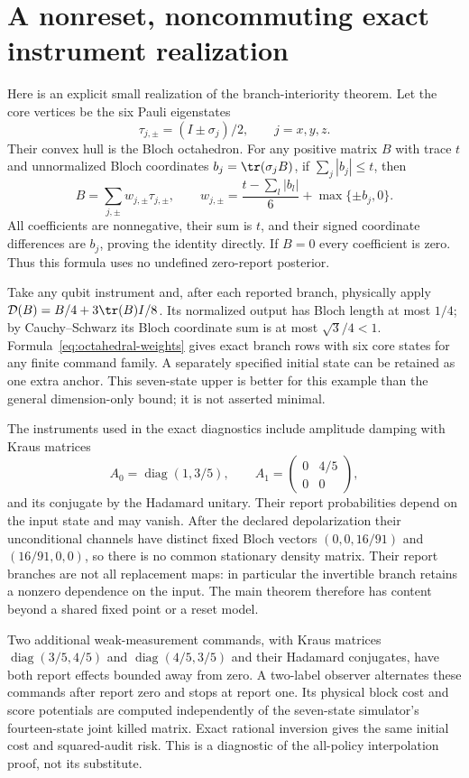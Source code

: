 \section{A nonreset, noncommuting exact instrument realization}\label{sec:supp-interior}
Here is an explicit small realization of the branch-interiority theorem. Let the core vertices be the six Pauli eigenstates
\[
 \tau_{j,\pm}=(I\pm\sigma_j)/2,\qquad j=x,y,z.
\]
Their convex hull is the Bloch octahedron. For any positive matrix $B$ with trace $t$ and unnormalized Bloch coordinates $b_j=\tr(\sigma_jB)$, if $\sum_j|b_j|\le t$, then
\begin{equation}\label{eq:octahedral-weights}
 B=\sum_{j,\pm}w_{j,\pm}\tau_{j,\pm},\qquad
 w_{j,\pm}=\frac{t-\sum_l|b_l|}{6}+\max\{\pm b_j,0\}.
\end{equation}
All coefficients are nonnegative, their sum is $t$, and their signed coordinate differences are $b_j$, proving the identity directly. If $B=0$ every coefficient is zero. Thus this formula uses no undefined zero-report posterior.

Take any qubit instrument and, after each reported branch, physically apply
$\mathcal D(B)=B/4+3\tr(B)I/8$. Its normalized output has Bloch length at most $1/4$; by Cauchy--Schwarz its Bloch coordinate sum is at most $\sqrt3/4<1$. Formula~\eqref{eq:octahedral-weights} gives exact branch rows with six core states for any finite command family. A separately specified initial state can be retained as one extra anchor. This seven-state upper is better for this example than the general dimension-only bound; it is not asserted minimal.

The instruments used in the exact diagnostics include amplitude damping with Kraus matrices
\[
 A_0=\operatorname{diag}(1,3/5),\qquad
 A_1=\begin{pmatrix}0&4/5\\0&0\end{pmatrix},
\]
and its conjugate by the Hadamard unitary. Their report probabilities depend on the input state and may vanish. After the declared depolarization their unconditional channels have distinct fixed Bloch vectors $(0,0,16/91)$ and $(16/91,0,0)$, so there is no common stationary density matrix. Their report branches are not all replacement maps: in particular the invertible branch retains a nonzero dependence on the input. The main theorem therefore has content beyond a shared fixed point or a reset model.

Two additional weak-measurement commands, with Kraus matrices
$\operatorname{diag}(3/5,4/5)$ and $\operatorname{diag}(4/5,3/5)$ and their Hadamard conjugates, have both report effects bounded away from zero. A two-label observer alternates these commands after report zero and stops at report one. Its physical block cost and score potentials are computed independently of the seven-state simulator's fourteen-state joint killed matrix. Exact rational inversion gives the same initial cost and squared-audit risk. This is a diagnostic of the all-policy interpolation proof, not its substitute.

